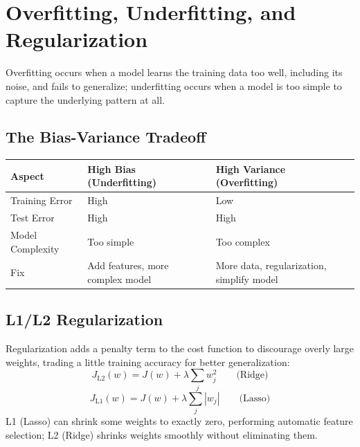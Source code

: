 \documentclass[11pt,a4paper]{article}
\begin{document}
\section{Overfitting, Underfitting, and Regularization}

\begin{definitionbox}
Overfitting occurs when a model learns the training data too well, including its noise, and fails to generalize; underfitting occurs when a model is too simple to capture the underlying pattern at all.
\end{definitionbox}

\subsection{The Bias-Variance Tradeoff}
\begin{center}
\begin{tabular}{@{}p{2.6cm}p{5.2cm}p{5.2cm}@{}}
\toprule
\rowcolor{primary!15}
\textbf{Aspect} & \textbf{High Bias (Underfitting)} & \textbf{High Variance (Overfitting)} \\
\midrule
Training Error & High & Low \\
Test Error & High & High \\
Model Complexity & Too simple & Too complex \\
Fix & Add features, more complex model & More data, regularization, simplify model \\
\bottomrule
\end{tabular}
\end{center}

\subsection{L1/L2 Regularization}
\begin{conceptbox}
Regularization adds a penalty term to the cost function to discourage overly large weights, trading a little training accuracy for better generalization:
$$
J_{\text{L2}}(w) = J(w) + \lambda \sum_j w_j^2 \qquad \text{(Ridge)}
$$
$$
J_{\text{L1}}(w) = J(w) + \lambda \sum_j |w_j| \qquad \text{(Lasso)}
$$
L1 (Lasso) can shrink some weights to exactly zero, performing automatic feature selection; L2 (Ridge) shrinks weights smoothly without eliminating them.
\end{conceptbox}
\end{document}
